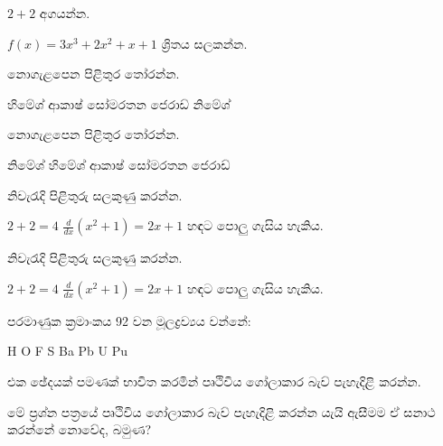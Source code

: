 \documentclass[12pt]{exam}
\begin{document}
\begin{questions}

\question[1] $2+2$ අගයන්න.
\addpoints

\question[20] $f(x)=3x^3+2x^2+x+1$ ශ්‍රිතය සලකන්න.
\noaddpoints %
\addpoints

\question[2] නොගැළපෙන පිළිතුර තෝරන්න.
\begin{choices}
\choice හිමේශ්
\choice ආකාෂ්
\choice සෝමරතන
\choice ජෙරාඩ්
\CorrectChoice නිමේශ්
\end{choices}

\question[2] නොගැළපෙන පිළිතුර තෝරන්න.
\begin{oneparchoices}
\CorrectChoice නිමේශ්
\choice හිමේශ්
\choice ආකාෂ්
\choice සෝමරතන
\choice ජෙරාඩ්
\end{oneparchoices}

\question[3] නිවැරැදි පිළිතුරු සලකුණු කරන්න.
\addpoints
\begin{checkboxes}
\CorrectChoice $2+2=4$
\choice $\frac{d}{dx} (x^2+1) = 2x+1$
\CorrectChoice හඳට පොලු ගැසිය හැකිය.
\end{checkboxes}
{%
\checkboxchar{$\Box$} %
\question[3] නිවැරැදි පිළිතුරු සලකුණු කරන්න.
\addpoints
\begin{checkboxes}
\choice $2+2=4$
\CorrectChoice $\frac{d}{dx} (x^2+1) = 2x+1$
\choice හඳට පොලු ගැසිය හැකිය.
\end{checkboxes}
}%

{%
\renewcommand*\thechoice{\arabic{choice}} 
\renewcommand*\choicelabel{\thechoice)}
%
\question[2] පරමාණුක ක්‍රමාංකය 92 වන මූලද්‍රව්‍යය වන්නේ:
\begin{multicols}{2}
\begin{choices}
\choice H
\choice O
\choice F
\choice S
\choice Ba
\choice Pb
\CorrectChoice U
\choice Pu
\end{choices}
\end{multicols}
}%

\question[10]
එක ඡේදයක් පමණක් භාවිත කරමින් පෘථිවිය ගෝලාකාර බැව් පැහැදිළි කරන්න.
\begin{solutionbox}{2in}
මේ ප්‍රශ්න පත්‍රයේ පෘථිවිය ග‌ෝලාකාර බැව් පැහැදිළි කරන්න යැයි ඇසීමම ඒ සනාථ කරන්නේ 
නොවේද, බමුණ?
    

\end{solutionbox}
\end{questions}
\end{document}
